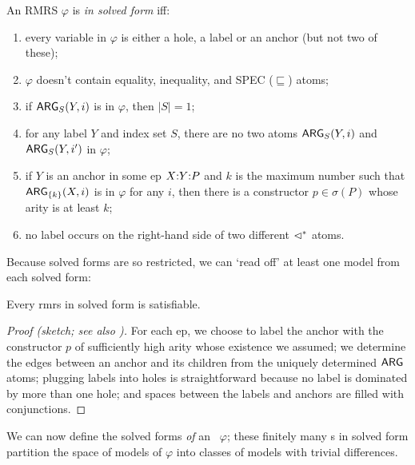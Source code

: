 \begin{definition}\label{defn:solved-forms}
  An RMRS $\varphi$ is \emph{in solved form} iff:
  \begin{enumerate}
  \item every variable in $\varphi$ is either a hole, a label or an
    anchor (but not two of these);
  \item $\varphi$ doesn't contain equality, inequality, and SPEC
    ($\sqsubseteq$) atoms;
  \item if $\mathsf{ARG}_S(Y,i)$ is in $\varphi$, then $|S| = 1$;
  \item for any label $Y$ and index set $S$, there
    are no two atoms $\mathsf{ARG}_S(Y,i)$ and $\mathsf{ARG}_S(Y,i')$ in $\varphi$;
  \item if $Y$ is an anchor in some {\sc ep} $X {:} Y {:} P$ and $k$ is the
    maximum number such that $\mathsf{ARG}_{\{k\}}(X,i)$ is in $\varphi$ for
    any $i$, then there is a constructor $p \in \sigma(P)$ whose arity
    is at least $k$;
  \item no label occurs on the right-hand side of two
    different $\lhd^*$ atoms.
  \end{enumerate}
\end{definition}

Because solved forms are so restricted, we can `read off' at least one
model from each solved form:
\begin{prop} \label{prop:solved-forms-are-satisfiable}
  Every {\sc rmrs} in solved form is satisfiable.
\end{prop}
\begin{proof}[Proof (sketch; see also
  \cite{Duchier00dominanceconstraints})] 
  For each {\sc ep}, we choose to label the anchor with the
  constructor $p$ of sufficiently high arity whose existence we
  assumed; we determine the edges between an anchor and its children
  from the uniquely determined $\mathsf{ARG}$ atoms; plugging labels into
  holes is straightforward because no label is dominated by more than
  one hole; and spaces between the labels and anchors are filled with
  conjunctions.
\end{proof}


We can now define the solved forms \emph{of} an \rmrs\ $\varphi$;
these finitely many \rmrs s in solved form partition the space of
models of $\varphi$ into classes of models with trivial differences.

